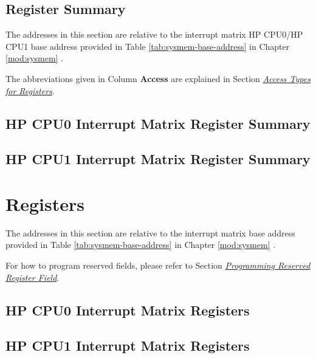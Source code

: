 \documentclass[main\_\_EN.tex]{subfiles}
\begin{document}
\newpage
\hypertarget{intmtrx-reg-summ}{}
\begin{landscape}
\section{Register Summary}
\label{sec:{intmtrx--reg-summ}}

The addresses in this section are relative to the interrupt matrix HP CPU0/HP CPU1 base address provided in Table \ref{tab:sysmem-base-address} in Chapter \ref{mod:sysmem} \textit{}.

The abbreviations given in Column \textbf{Access} are explained in Section \hyperref[glossary-access-types]{\textit{Access Types for Registers}}.


\subsection{HP CPU0 Interrupt Matrix Register Summary}
\label{sec: cpu0-intmtrx-reg-summ}



\subsection{HP CPU1 Interrupt Matrix Register Summary}
\label{sec: cpu1-intmtrx-reg-summ}


\end{landscape}





\newpage
\section{Registers}

The addresses in this section are relative to  the interrupt matrix base address provided in Table \ref{tab:sysmem-base-address} in Chapter \ref{mod:sysmem} \textit{}.

For how to program reserved fields, please refer to Section \hyperref[programming-reserved-field]{\textit{Programming Reserved Register Field}}.

\subsection{HP CPU0 Interrupt Matrix Registers}
\label{sec: cpu0-intmtrx-reg}



\subsection{HP CPU1 Interrupt Matrix Registers}
\label{sec: cpu1-intmtrx-reg}

\end{document}
